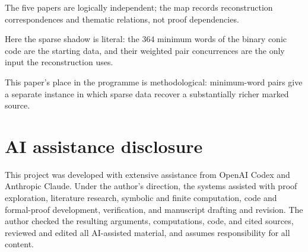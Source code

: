 \documentclass[11pt]{article}
\theoremstyle{definition}
\theoremstyle{remark}
\begin{document}
The five papers are logically independent; the map records reconstruction
correspondences and thematic relations, not proof dependencies.

Here the sparse shadow is literal: the \(364\) minimum words of the binary
conic code are the starting data, and their weighted pair concurrences are
the only input the reconstruction uses.

This paper's place in the programme is methodological: minimum-word pairs give
a separate instance in which sparse data recover a substantially richer marked
source.

\section*{AI assistance disclosure}

This project was developed with extensive assistance from OpenAI Codex and
Anthropic Claude. Under the author's direction, the systems assisted with
proof exploration, literature research, symbolic and finite computation,
code and formal-proof development, verification, and manuscript drafting and
revision. The author checked the resulting arguments, computations, code,
and cited sources, reviewed and edited all AI-assisted material, and assumes
responsibility for all content.
\end{document}
